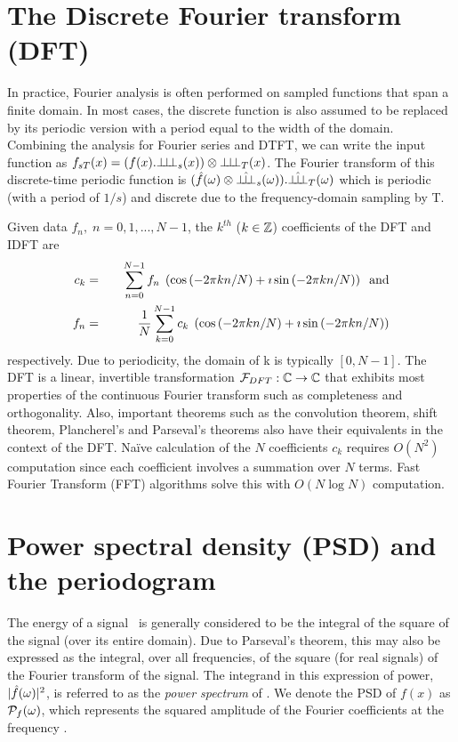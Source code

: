 \section{The Discrete Fourier transform (DFT)}
In practice, Fourier analysis is often performed on sampled functions that span a finite domain. In most cases, the discrete function is also assumed to be replaced by its periodic version with a period equal to the width of the domain. Combining the analysis for Fourier series and DTFT, we can write the input function as $f_{sT}(x) = (f(x) . {\bot\hspace{-.7ex}\bot\hspace{-.7ex}\bot}_{s}(x)) \otimes {\bot\hspace{-.7ex}\bot\hspace{-.7ex}\bot}_{T}(x)$. The Fourier transform of this discrete-time periodic function is $(\hat{f}(\omega) \otimes \hat{{\bot\hspace{-.8ex}\bot\hspace{-.8ex}\bot}}_{s}(\omega)) . \hat{{\bot\hspace{-.8ex}\bot\hspace{-.8ex}\bot}}_{T}(\omega)$ which is periodic (with a period of $1/s$) and discrete due to the frequency-domain sampling by \SHAF T.

Given data $f_n, \; n=0,1,...,N-1$, the $k^{th}$ ($k\in\mathbb{Z}$) coefficients of the DFT and IDFT are 
\begin{eqnarray}
 \label{eq:DFT}c_k &=& \quad \sum\limits_{n=0}^{N-1} f_n \; \left( \cos{(-2\pi k n/N)} + \mathrm{\imath} \sin{(-2\pi k n/N)} \right) \;\; \mathrm{and}\\
 \label{eq:IDFT} f_n &=& \frac 1 N \sum\limits_{k=0}^{N-1} c_k \; \left( \cos{(-2\pi k n/N)} + \mathrm{\imath} \sin{(-2\pi k n/N)} \right)
\end{eqnarray}
respectively. Due to periodicity, the domain of k is typically $[0,N-1]$. The DFT is a linear, invertible transformation $\mathcal{F}_{DFT}: \mathbb{C} \rightarrow \mathbb{C}$ that exhibits most properties of the continuous Fourier transform such as completeness and orthogonality. Also, important theorems such as the convolution theorem, shift theorem, Plancherel's and Parseval's theorems also have their equivalents in the context of the DFT. Na\"ive calculation of the $N$ coefficients $c_k$ requires $O(N^2)$ computation since each coefficient involves a summation over $N$ terms. Fast Fourier Transform (FFT) algorithms solve this with $O(N \log{N})$ computation.

\section{Power spectral density (PSD) and the periodogram}
The energy of a signal \ifn\ is generally considered to be the integral of the square of the signal (over its entire domain). Due to Parseval's theorem, this may also be expressed as the integral, over all frequencies, of the square (for real signals) of the Fourier transform of the signal. The integrand in this expression of power, $|\hat{f}(\omega)|^2$, is referred to as the \textit{power spectrum} of \ifn. We denote the PSD of $f(x)$ as $\mathcal{P}_{f}(\omega)$, which represents the squared amplitude of the Fourier coefficients at the frequency \fv. 

